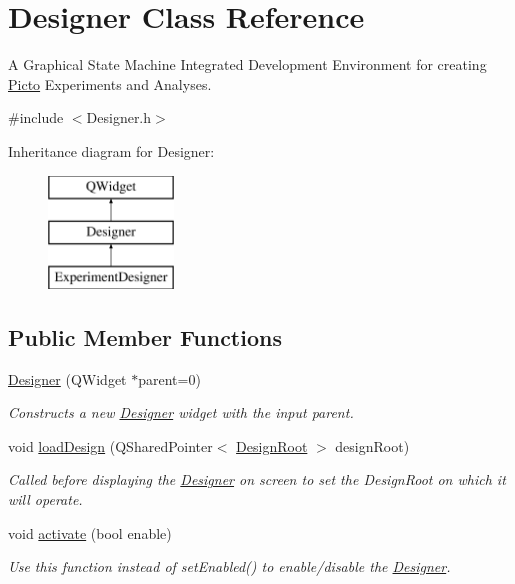 \hypertarget{class_designer}{\section{Designer Class Reference}
\label{class_designer}
}


A Graphical State Machine Integrated Development Environment for creating \hyperlink{namespace_picto}{Picto} Experiments and Analyses.  




{\ttfamily \#include $<$Designer.\-h$>$}

Inheritance diagram for Designer\-:\begin{figure}[H]
\begin{center}
\leavevmode
\includegraphics[height=3.000000cm]{class_designer}
\end{center}
\end{figure}
\subsection*{Public Member Functions}
\begin{DoxyCompactItemize}
\item 
\hyperlink{class_designer_a4fe366907b33810289ff6dbfec92bb6b}{Designer} (Q\-Widget $\ast$parent=0)
\begin{DoxyCompactList}\small\item\em Constructs a new \hyperlink{class_designer}{Designer} widget with the input parent. \end{DoxyCompactList}\item 
void \hyperlink{class_designer_a88737acaeeaf7223fdd2f928df93ba8d}{load\-Design} (Q\-Shared\-Pointer$<$ \hyperlink{class_picto_1_1_design_root}{Design\-Root} $>$ design\-Root)
\begin{DoxyCompactList}\small\item\em Called before displaying the \hyperlink{class_designer}{Designer} on screen to set the Design\-Root on which it will operate. \end{DoxyCompactList}\item 
void \hyperlink{class_designer_a75f663af7babbf620ddf571f53371b50}{activate} (bool enable)
\begin{DoxyCompactList}\small\item\em Use this function instead of set\-Enabled() to enable/disable the \hyperlink{class_designer}{Designer}. \end{DoxyCompactList}\end{DoxyCompactItemize}


